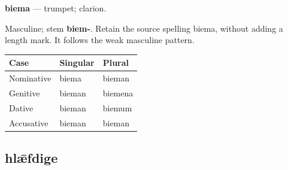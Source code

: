 \par\begin{minipage}{\linewidth}\raggedright
\textbf{biema} — trumpet; clarion.

Masculine; stem \textbf{biem-}. Retain the source spelling biema, without adding a length mark. It follows the weak masculine pattern.

\par\begingroup
\fontsize{10.5}{13.2}\selectfont
\setlength{\LTleft}{0pt}\setlength{\LTright}{\fill}
\noindent
\begin{tabular}{@{}>{\raggedright\arraybackslash}p{39.46mm}>{\raggedright\arraybackslash}p{39.46mm}>{\raggedright\arraybackslash}p{39.46mm}@{}}
\toprule
\textbf{Case} & \textbf{Singular} & \textbf{Plural} \\
\midrule
Nominative & biema & bieman \\
Genitive & bieman & biemena \\
Dative & bieman & biemum \\
Accusative & bieman & bieman \\
\bottomrule
\end{tabular}
\par\endgroup

\end{minipage}\par
{}
\subsection*{hlǣfdige}

